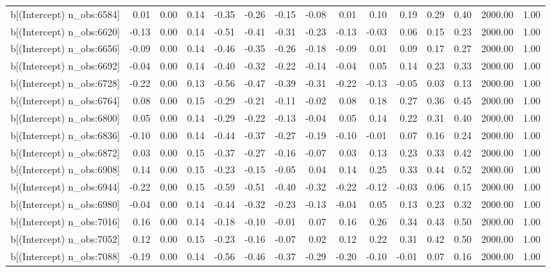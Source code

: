 \begin{table}[ht]
\begin{tabular}{rrrrrrrrrrrrrrr}
  b[(Intercept) n\_obs:6584] & 0.01 & 0.00 & 0.14 & -0.35 & -0.26 & -0.15 & -0.08 & 0.01 & 0.10 & 0.19 & 0.29 & 0.40 & 2000.00 & 1.00 \\ 
  b[(Intercept) n\_obs:6620] & -0.13 & 0.00 & 0.14 & -0.51 & -0.41 & -0.31 & -0.23 & -0.13 & -0.03 & 0.06 & 0.15 & 0.23 & 2000.00 & 1.00 \\ 
  b[(Intercept) n\_obs:6656] & -0.09 & 0.00 & 0.14 & -0.46 & -0.35 & -0.26 & -0.18 & -0.09 & 0.01 & 0.09 & 0.17 & 0.27 & 2000.00 & 1.00 \\ 
  b[(Intercept) n\_obs:6692] & -0.04 & 0.00 & 0.14 & -0.40 & -0.32 & -0.22 & -0.14 & -0.04 & 0.05 & 0.14 & 0.23 & 0.33 & 2000.00 & 1.00 \\ 
  b[(Intercept) n\_obs:6728] & -0.22 & 0.00 & 0.13 & -0.56 & -0.47 & -0.39 & -0.31 & -0.22 & -0.13 & -0.05 & 0.03 & 0.13 & 2000.00 & 1.00 \\ 
  b[(Intercept) n\_obs:6764] & 0.08 & 0.00 & 0.15 & -0.29 & -0.21 & -0.11 & -0.02 & 0.08 & 0.18 & 0.27 & 0.36 & 0.45 & 2000.00 & 1.00 \\ 
  b[(Intercept) n\_obs:6800] & 0.05 & 0.00 & 0.14 & -0.29 & -0.22 & -0.13 & -0.04 & 0.05 & 0.14 & 0.22 & 0.31 & 0.40 & 2000.00 & 1.00 \\ 
  b[(Intercept) n\_obs:6836] & -0.10 & 0.00 & 0.14 & -0.44 & -0.37 & -0.27 & -0.19 & -0.10 & -0.01 & 0.07 & 0.16 & 0.24 & 2000.00 & 1.00 \\ 
  b[(Intercept) n\_obs:6872] & 0.03 & 0.00 & 0.15 & -0.37 & -0.27 & -0.16 & -0.07 & 0.03 & 0.13 & 0.23 & 0.33 & 0.42 & 2000.00 & 1.00 \\ 
  b[(Intercept) n\_obs:6908] & 0.14 & 0.00 & 0.15 & -0.23 & -0.15 & -0.05 & 0.04 & 0.14 & 0.25 & 0.33 & 0.44 & 0.52 & 2000.00 & 1.00 \\ 
  b[(Intercept) n\_obs:6944] & -0.22 & 0.00 & 0.15 & -0.59 & -0.51 & -0.40 & -0.32 & -0.22 & -0.12 & -0.03 & 0.06 & 0.15 & 2000.00 & 1.00 \\ 
  b[(Intercept) n\_obs:6980] & -0.04 & 0.00 & 0.14 & -0.44 & -0.32 & -0.23 & -0.13 & -0.04 & 0.05 & 0.13 & 0.23 & 0.32 & 2000.00 & 1.00 \\ 
  b[(Intercept) n\_obs:7016] & 0.16 & 0.00 & 0.14 & -0.18 & -0.10 & -0.01 & 0.07 & 0.16 & 0.26 & 0.34 & 0.43 & 0.50 & 2000.00 & 1.00 \\ 
  b[(Intercept) n\_obs:7052] & 0.12 & 0.00 & 0.15 & -0.23 & -0.16 & -0.07 & 0.02 & 0.12 & 0.22 & 0.31 & 0.42 & 0.50 & 2000.00 & 1.00 \\ 
  b[(Intercept) n\_obs:7088] & -0.19 & 0.00 & 0.14 & -0.56 & -0.46 & -0.37 & -0.29 & -0.20 & -0.10 & -0.01 & 0.07 & 0.16 & 2000.00 & 1.00 \\ 

\end{tabular}
\end{table}
